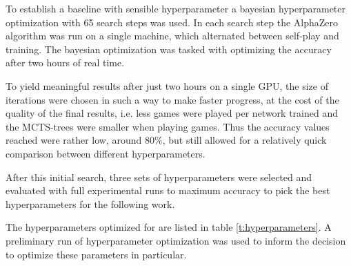 \documentclass[12pt,onecolumn,oneside,titlepage]{article}
\begin{document}
To establish a baseline with sensible hyperparameter a bayesian hyperparameter optimization with 65 search steps was used.
In each search step the AlphaZero algorithm was run on a single machine, which alternated between self-play and training. The bayesian optimization was tasked with optimizing the accuracy after two hours of real time. 

To yield meaningful results after just two hours on a single GPU,
the size of iterations were chosen in such a way to make faster progress, at the cost of the quality of the final results, i.e. less games were played per network trained and the MCTS-trees were smaller when playing games. Thus the accuracy values reached were rather low, around $80\%$,
but still allowed for a relatively quick comparison between different hyperparameters. 

After this initial search, three sets of hyperparameters were selected and evaluated with full experimental runs to maximum accuracy to pick the best hyperparameters for the following work.

The hyperparameters optimized for are listed in table \ref{t:hyperparameters}. A preliminary run of hyperparameter optimization was used to inform the decision to optimize these parameters in particular.
\end{document}
